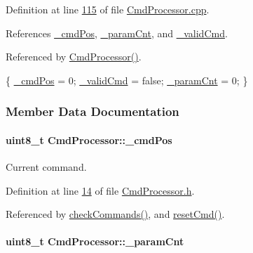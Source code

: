 Definition at line \hyperlink{_cmd_processor_8cpp_source_l00115}{115} of file \hyperlink{_cmd_processor_8cpp_source}{CmdProcessor.cpp}.



References \hyperlink{_cmd_processor_8h_source_l00014}{\_\-cmdPos}, \hyperlink{_cmd_processor_8h_source_l00018}{\_\-paramCnt}, and \hyperlink{_cmd_processor_8h_source_l00015}{\_\-validCmd}.



Referenced by \hyperlink{_cmd_processor_8cpp_source_l00011}{CmdProcessor()}.


\begin{DoxyCode}
\{
    \hyperlink{class_cmd_processor_a6201596327a378c5317c1f6a8a9d5bc4}{_cmdPos} = 0;
    \hyperlink{class_cmd_processor_a18b0886303779762a37096d6446aefa6}{_validCmd} = \textcolor{keyword}{false};
    \hyperlink{class_cmd_processor_aff0622d6e4fca6bf1352392936d6c5ea}{_paramCnt} = 0;
\}
\end{DoxyCode}


\subsubsection{Member Data Documentation}
\hypertarget{class_cmd_processor_a6201596327a378c5317c1f6a8a9d5bc4}{
\paragraph[{\_\-cmdPos}]{\setlength{\rightskip}{0pt plus 5cm}uint8\_\-t {\bf CmdProcessor::\_\-cmdPos}}\hfill}
\label{class_cmd_processor_a6201596327a378c5317c1f6a8a9d5bc4}


Current command. 



Definition at line \hyperlink{_cmd_processor_8h_source_l00014}{14} of file \hyperlink{_cmd_processor_8h_source}{CmdProcessor.h}.



Referenced by \hyperlink{_cmd_processor_8cpp_source_l00068}{checkCommands()}, and \hyperlink{_cmd_processor_8cpp_source_l00115}{resetCmd()}.

\hypertarget{class_cmd_processor_aff0622d6e4fca6bf1352392936d6c5ea}{
\paragraph[{\_\-paramCnt}]{\setlength{\rightskip}{0pt plus 5cm}uint8\_\-t {\bf CmdProcessor::\_\-paramCnt}}\hfill}
\label{class_cmd_processor_aff0622d6e4fca6bf1352392936d6c5ea}



